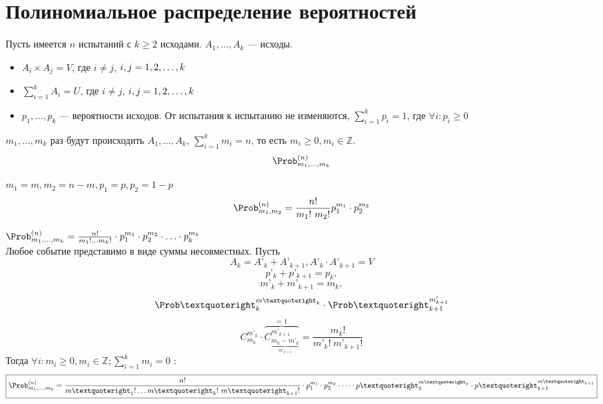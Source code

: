 \section{Полиномиальное распределение вероятностей}
Пусть имеется $n$ испытаний с $k \geqslant 2$ исходами. $A_1, \dots, A_k$ --- исходы.
\begin{itemize}
	\item $A_i \times A_j = V$, где $i \not = j$, $i, j = 1,2,\dots,k$
	\item $\sum\limits_{i=1}^k A_i = U$, где $i \not = j$, $i, j = 1,2,\dots,k$
	\item $p_1, \dots, p_k$ --- вероятности исходов. От испытания к испытанию не изменяются, $\sum\limits_{i=1}^k p_i = 1$, где $\forall i: p_i \geq 0$
\end{itemize}
$m_1, \dots, m_k$ раз будут происходить $A_1, \dots, A_k$, $\sum\limits_{i=1}^k m_i = n$, то есть $m_i \geq 0, m_i \in \mathbb{Z}$. \\
\[ \Prob_{m_1, \dots, m_k}^{(n)} \]
\begin{description}[leftmargin=0cm]
	\item[$k = 2, \Prob_{m_1, m_2}^{(n)}:$] $m_1 = m, m_2 = n-m, p_1 = p, p_2 = 1-p$
	      \[
		      \Prob_{m_1, m_2}^{(n)} = \frac{n!}{m_1 !\ m_2 !} p_1^{m_1} \cdot p_2^{m_2}
	      \]
	\item[$k \ge 2:$] $\Prob_{m_1, \ldots, m_k}^{(n)} = \frac{n!}{m_1 ! \ldots m_k !} \cdot p_1^{m_1} \cdot p_2^{m_2} \cdot \ldots \cdot p_k^{m_k}$ \\
	      Любое событие представимо в виде суммы несовместных. Пусть
		  \[ A_k = A’_k + A’_{k+1}, A’_k \cdot A’_{k+1} = V \]
		  \[ p’_k + p’_{k+1} = p_k, \]
		  \[ m’_k + m’_{k+1} = m_k, \]
		  \[ {\Prob’}_{k}^{m’_{k}} \cdot {\Prob’}_{k+1}^{m'_{k+1}} \]
	      \[ C_{m_k}^{{m’}_k} \cdot \overbrace{ C_{\underbrace{{m_k - {m’}_k}}_{{m’}_{k+1}}}^{{m’}_{k+1}} }^{\text{= 1}} = \frac{m_k !}{{m’}_k !\ {m’}_{k+1} !} \]
	      Тогда $ \forall i : m_i \geqslant 0, m_i \in \mathbb{Z};  \sum\limits_{i=1}^k m_i = 0$ :
	      \[
		      \boxed{\Prob_{m_1, \dots, m_k}^{(n)} = \frac{n!}{{m’}_1 ! \ldots {m’}_k !\ {m’}_{k+1} !} \cdot p_1^{m_1} \cdot p_2^{m_2} \cdot \dots \cdot {p’}_k^{{m’}_k} \cdot {p’}_{k+1}^{{m’}_{k+1}}}
	      \]
\end{description}

